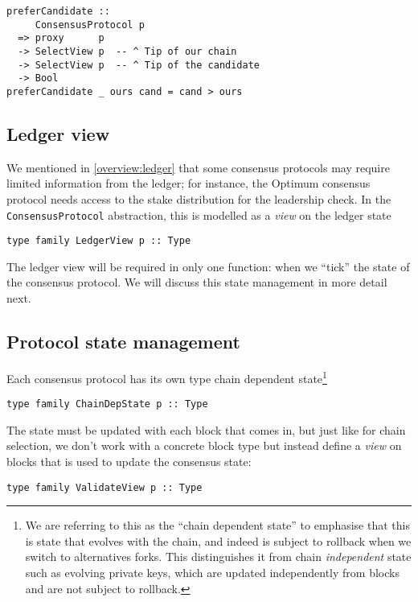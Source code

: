 \begin{lstlisting}
preferCandidate ::
     ConsensusProtocol p
  => proxy      p
  -> SelectView p  -- ^ Tip of our chain
  -> SelectView p  -- ^ Tip of the candidate
  -> Bool
preferCandidate _ ours cand = cand > ours
\end{lstlisting}

\subsection{Ledger view}
\label{consensus:class:ledgerview}

We mentioned in \cref{overview:ledger} that some consensus protocols may require
limited information from the ledger; for instance, the Optimum consensus protocol
needs access to the stake distribution for the leadership check. In the
\lstinline!ConsensusProtocol! abstraction, this is modelled as a \emph{view}
on the ledger state

\begin{lstlisting}
type family LedgerView p :: Type
\end{lstlisting}

The ledger view will be required in only one function: when we ``tick'' the
state of the consensus protocol. We will discuss this state management in more
detail next.

\subsection{Protocol state management}
\label{consensus:class:state}

Each consensus protocol has its own type chain dependent state\footnote{We are
referring to this as the ``chain dependent state'' to emphasise that this is
state that evolves with the chain, and indeed is subject to rollback when we
switch to alternatives forks. This distinguishes it from chain
\emph{independent} state such as evolving private keys, which are updated
independently from blocks and are not subject to rollback.}

\begin{lstlisting}
type family ChainDepState p :: Type
\end{lstlisting}

The state must be updated with each block that comes in, but just like for
chain selection, we don't work with a concrete block type but instead define a
\emph{view} on blocks that is used to update the consensus state:

\begin{lstlisting}
type family ValidateView p :: Type
\end{lstlisting}


